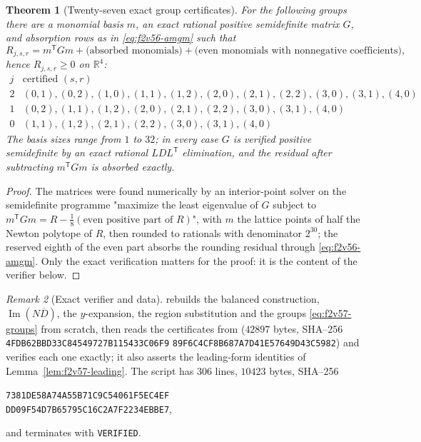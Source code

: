 \documentclass[11pt]{article}
\newtheorem{theorem}{Theorem}[section]
\theoremstyle{definition}
\theoremstyle{remark}
\newtheorem{remark}[theorem]{Remark}
\begin{document}
\begin{theorem}[Twenty-seven exact group certificates]
\label{thm:f2v57-groups}
For the following groups there are a monomial basis \(m\), an exact
rational positive semidefinite matrix \(G\), and absorption rows as in
\eqref{eq:f2v56-amgm} such that
\begin{equation}
 R_{j,s,r}=m^{\mathsf T}Gm+\text{(absorbed monomials)}+\text{(even monomials with nonnegative coefficients)},
 \label{eq:f2v57-cert}
\end{equation}
hence \(R_{j,s,r}\ge0\) on \(\mathbb R^4\):
\[
\begin{array}{c|l}
 j&\text{certified }(s,r)\\ \hline
 2&(0,1),(0,2),(1,0),(1,1),(1,2),(2,0),(2,1),(2,2),(3,0),(3,1),(4,0)\\
 1&(0,2),(1,1),(1,2),(2,0),(2,1),(2,2),(3,0),(3,1),(4,0)\\
 0&(1,1),(1,2),(2,1),(2,2),(3,0),(3,1),(4,0)
\end{array}
\]
The basis sizes range from \(1\) to \(32\); in every case \(G\) is
verified positive semidefinite by an exact rational
\(LDL^{\mathsf T}\) elimination, and the residual after subtracting
\(m^{\mathsf T}Gm\) is absorbed exactly.
\end{theorem}

\begin{proof}
The matrices were found numerically by an interior-point solver on the
semidefinite programme "maximize the least eigenvalue of \(G\) subject to
\(m^{\mathsf T}Gm=R-\tfrac18(\text{even positive part of }R)\)", with
\(m\) the lattice points of half the Newton polytope of \(R\), then
rounded to rationals with denominator \(2^{30}\); the reserved eighth of
the even part absorbs the rounding residual through
\eqref{eq:f2v56-amgm}.  Only the exact verification matters for the
proof: it is the content of the verifier below.
\end{proof}

\begin{remark}[Exact verifier and data]
\label{rem:f2v57-verifier}
 rebuilds the
balanced construction, \(\operatorname{Im}(N\overline D)\), the
\(y\)-expansion, the region substitution and the groups
\eqref{eq:f2v57-groups} from scratch, then reads the certificates from
 (\(42897\) bytes,
SHA--256
\texttt{4FDB62BBD33C84549727B115433C06F9}\allowbreak
\texttt{89F6C4CF8B687A7D41E57649D43C5982})
and verifies each one exactly; it also asserts the leading-form
identities of Lemma~\ref{lem:f2v57-leading}.  The script has \(306\)
lines, \(10423\) bytes, SHA--256
\begin{center}
\texttt{7381DE58A74A55B71C9C54061F5EC4EF}\\
\texttt{DD09F54D7B65795C16C2A7F2234EBBE7},
\end{center}
and terminates with \texttt{VERIFIED}.
\end{remark}
\end{document}

